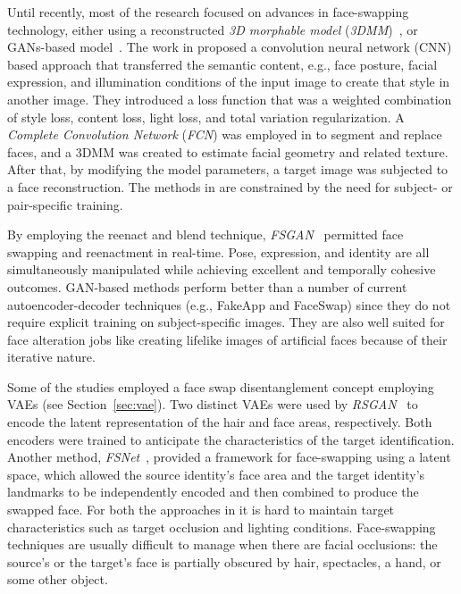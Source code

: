 \documentclass[preprint]{elsarticle}
\begin{document}
Until recently, most of the research focused on advances in face-swapping technology, either using a reconstructed \emph{3D morphable model} (\emph{3DMM})~\cite{irina,nirkin}, or GANs-based model~\cite{fsgan}. The work in \cite{irina} proposed a convolution neural network (CNN) based approach that transferred the semantic content, e.g., face posture, facial expression, and illumination conditions of the input image to create that style in another image. They introduced a loss function that was a weighted combination of style loss, content loss, light loss, and total variation regularization.  A \emph{Complete Convolution Network} (\emph{FCN}) was employed in \cite{nirkin} to segment and replace faces, and a 3DMM was created to estimate facial geometry and related texture. After that, by modifying the model parameters, a target image was subjected to a face reconstruction. The methods in \cite{irina,nirkin} are constrained by the need for subject- or pair-specific training.


By employing the reenact and blend technique, \emph{FSGAN}~\cite{fsgan} permitted face swapping and reenactment in real-time. Pose, expression, and identity are all simultaneously manipulated while achieving excellent and temporally cohesive outcomes.  GAN-based methods  perform better than a number of current autoencoder-decoder techniques (e.g., FakeApp and FaceSwap) since they do not require explicit training on subject-specific images. They are also well suited for face alteration jobs like creating lifelike images of artificial faces because of their iterative nature.


Some of the studies employed a face swap disentanglement concept employing VAEs (see Section~\ref{sec:vae}). Two distinct VAEs were used by \emph{RSGAN}~\cite{rsgan} to encode the latent representation of the hair and face areas, respectively. Both encoders were trained to anticipate the characteristics of the target identification. Another method, \emph{FSNet}~\cite{fsnet}, provided a framework for face-swapping using a latent space, which allowed the source identity's face area and the target identity's landmarks to be independently encoded and then combined to produce the swapped face. For both the approaches in \cite{rsgan,fsnet} it is hard to maintain target characteristics such as target occlusion and lighting conditions. Face-swapping techniques are usually difficult to manage when there are facial occlusions: the source's or the target's face is partially obscured by hair, spectacles, a hand, or some other object.
\end{document}
